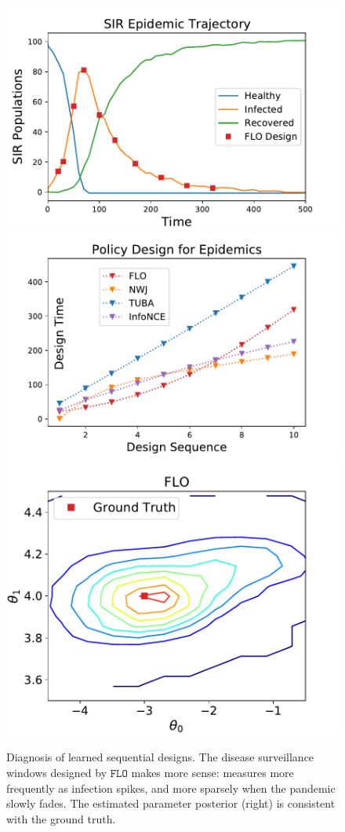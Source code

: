 \documentclass{article}
\theoremstyle{plain}
\theoremstyle{definition}
\theoremstyle{remark}
\newcommand{\FLO}{\texttt{FLO}}
\begin{document}
		
		\begin{figure}[t!]
			\begin{center}
				\includegraphics[width=.35\textwidth,trim={0 0 .5in 0},clip]{figures/design/SIRprocess}
				\includegraphics[width=.32\textwidth,trim={0.08in 0 0in 0},clip]{figures/design/SIRDesign}
				\includegraphics[height=.255\textwidth,trim={0 0 0.6in 0},clip]{figures/design/posteriorFLO1}
			\end{center}
			\vspace{-1.5em}
			\caption{Diagnosis of learned sequential designs. The disease surveillance windows designed by $\FLO$ makes more sense: measures more frequently as infection spikes, and more sparsely when the pandemic slowly fades. The estimated parameter posterior (right) is consistent with the ground truth. \label{fig:boed}}
			\vspace{-1.em}
		\end{figure}
		
		
\end{document}
